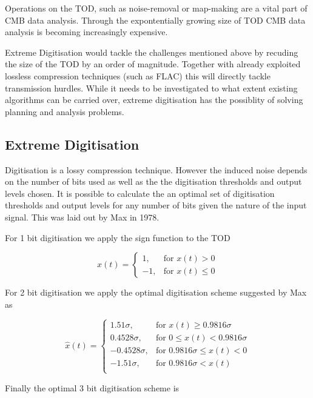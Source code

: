 \documentclass[apj]{emulateapj}
\begin{document}
Operations on the TOD, such as noise-removal or map-making are a vital part of CMB data analysis. Through the expontentially growing size of TOD CMB data analysis is becoming increasingly expensive.


Extreme Digitisation would tackle the challenges mentioned above by recuding the size of the TOD by an order of magnitude. Together with already exploited lossless compression techniques (such as FLAC) this will directly tackle transmission hurdles. While it needs to be investigated to what extent existing algorithms can be carried over, extreme digitisation has the possiblity of solving planning and analysis problems.

\subsection{Extreme Digitisation}
\label{subsec:extremedigitisation}

Digitisation is a lossy compression technique. However the induced noise depends on the number of bits used as well as the the digitisation thresholds and output levels chosen. It is possible to calculate the an optimal set of digitisation thresholds and output levels for any number of bits  given the nature of the input signal. This was laid out by Max in 1978.

For 1 bit digitisation we apply the sign function to the TOD 

\[ \hat{x}(t) = \left\{ \begin{array}{lr}
1, & \text{for } x(t) > 0\\
-1, & \text{for } x(t) \leq 0
\end{array} \right. \]

For 2 bit digitisation we apply the optimal digitisation scheme suggested by Max as

\[ \hat{x}(t) = \left\{ \begin{array}{lr}
1.51 \sigma, & \text{for } x(t) \geq 0.9816 \sigma\\
0.4528 \sigma, & \text{for } 0 \leq x(t) < 0.9816 \sigma\\
-0.4528 \sigma, & \text{for } 0.9816 \sigma \leq x(t) < 0\\
-1.51 \sigma, & \text{for } 0.9816 \sigma < x(t)\\
\end{array} \right. \]

Finally the optimal 3 bit digitisation scheme is 
\end{document}
